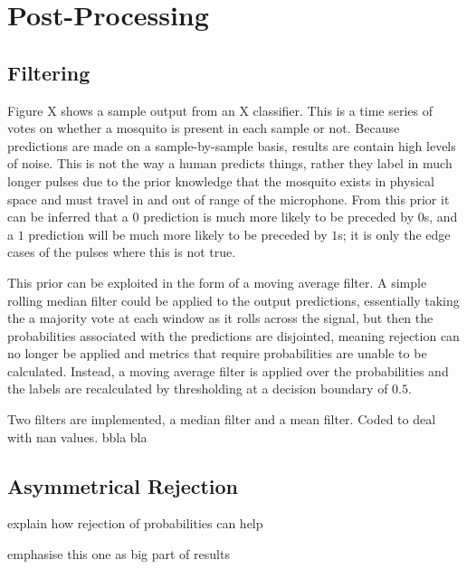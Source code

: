 \section{Post-Processing}
\label{sec:pl-postproc}
    \subsection{Filtering}
    \label{subsec:pl-postproc-filt}
        Figure X shows a sample output from an X classifier. This is a time series of votes on whether a mosquito is present in each sample or not. Because predictions are made on a sample-by-sample basis, results are contain high levels of noise. This is not the way a human predicts things, rather they label in much longer pulses due to the prior knowledge that the mosquito exists in physical space and must travel in and out of range of the microphone. From this prior it can be inferred that a $0$ prediction is much more likely to be preceded by $0$s, and a $1$ prediction will be much more likely to be preceded by $1$s; it is only the edge cases of the pulses where this is not true. 
        
        This prior can be exploited in the form of a moving average filter. A simple rolling median filter could be applied to the output predictions, essentially taking the a majority vote at each window as it rolls across the signal, but then the probabilities associated with the predictions are disjointed, meaning rejection can no longer be applied and metrics that require probabilities are unable to be calculated. Instead, a moving average filter is applied over the probabilities and the labels are recalculated by thresholding at a decision boundary of $0.5$.
        
        Two filters are implemented, a median filter and a mean filter. Coded to deal with nan values. bbla bla
        
    \subsection{Asymmetrical Rejection}
    \label{subsec:pl-postproc-rej}
        \begin{sitemize}
            \item{explain how rejection of probabilities can help}
            \item{emphasise this one as big part of results}
        \end{sitemize}
        
